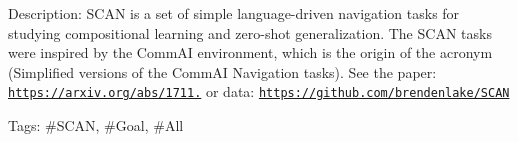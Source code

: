 Description\+: S\+C\+AN is a set of simple language-\/driven navigation tasks for studying compositional learning and zero-\/shot generalization. The S\+C\+AN tasks were inspired by the Comm\+AI environment, which is the origin of the acronym (Simplified versions of the Comm\+AI Navigation tasks). See the paper\+: \href{https://arxiv.org/abs/1711.00350}{\tt https\+://arxiv.\+org/abs/1711.} or data\+: \href{https://github.com/brendenlake/SCAN}{\tt https\+://github.\+com/brendenlake/\+S\+C\+AN}

Tags\+: \#\+S\+C\+AN, \#\+Goal, \#\+All 